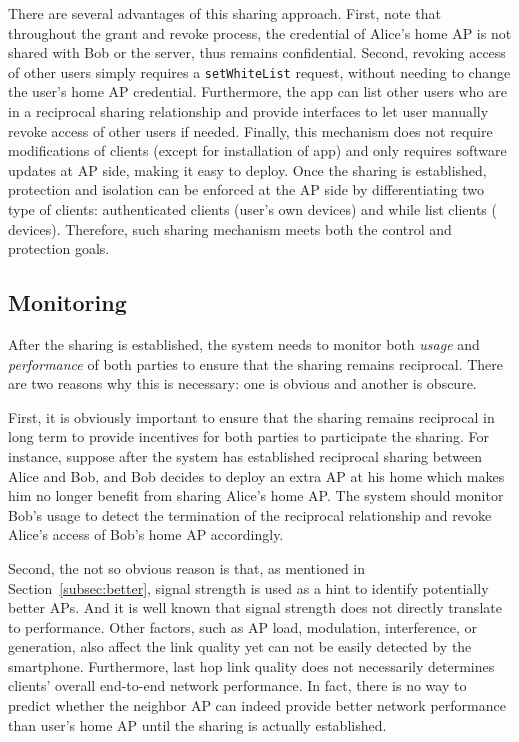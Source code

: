 There are several advantages of this sharing approach. First, note that
throughout the grant and revoke process, the \wifi{} credential of Alice's home
AP is not shared with Bob or the \wisefi{} server, thus remains confidential.
Second, revoking access of other \wisefi{} users simply requires a
\texttt{setWhiteList} request, without needing to change the user's home AP
\wifi{} credential. Furthermore, the \wisefi{} app can list other \wisefi{}
users who are in a reciprocal sharing relationship and provide interfaces to let
user manually revoke access of other users if needed. Finally, this mechanism
does not require modifications of \wifi{} clients (except for installation of
\wisefi{} app) and only requires software updates at AP side, making it easy to
deploy.  Once the sharing is established, protection and isolation can be
enforced at the AP side by differentiating two type of clients: authenticated
clients (user's own devices) and while list clients (\wisefi{} devices).
Therefore, such sharing mechanism meets both the control and protection goals.


\subsection{Monitoring}
\label{subsec:monitoring}

After the sharing is established, the system needs to monitor both \wifi{}
\textit{usage} and \textit{performance} of both parties to ensure that the
sharing remains reciprocal.  There are two reasons why this is necessary: one is
obvious and another is obscure.

First, it is obviously important to ensure that the sharing remains reciprocal
in long term to provide incentives for both parties to participate the sharing.
For instance, suppose after the system has established reciprocal \wifi{} sharing
between Alice and Bob, and Bob decides to deploy an extra AP at his home which
makes him no longer benefit from sharing Alice's home AP. The system should
monitor Bob's \wifi{} usage to detect the termination of the reciprocal
relationship and revoke Alice's access of Bob's home AP accordingly.

Second, the not so obvious reason is that, as mentioned in
Section~\ref{subsec:better}, \wifi{} signal strength is used as a hint to
identify potentially better APs. And it is well known that signal strength does
not directly translate to \wifi{} performance. Other factors, such as AP load,
modulation, interference, or \wifi{} generation, also affect the link quality
yet can not be easily detected by the smartphone. Furthermore, last hop \wifi{}
link quality does not necessarily determines clients' overall end-to-end network
performance. In fact, there is no way to predict whether the neighbor AP can
indeed provide better network performance than user's home AP until the sharing is
actually established.

